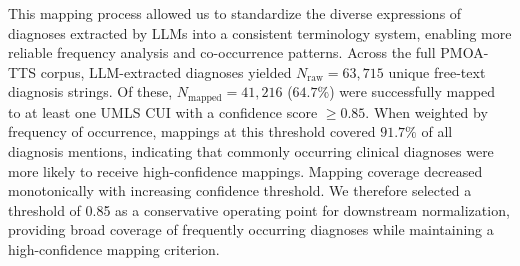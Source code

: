 This mapping process allowed us to standardize the diverse expressions of diagnoses extracted by LLMs into a consistent terminology system, enabling more reliable frequency analysis and co-occurrence patterns. 
Across the full PMOA-TTS corpus, LLM-extracted diagnoses yielded
$N_{\text{raw}} = 63{,}715$ unique free-text diagnosis strings.
Of these, $N_{\text{mapped}} = 41{,}216$ ($64.7\%$) were successfully mapped to at least one
UMLS CUI with a confidence score $\ge 0.85$.
When weighted by frequency of occurrence, mappings at this threshold covered
$91.7\%$ of all diagnosis mentions, indicating that commonly occurring clinical
diagnoses were more likely to receive high-confidence mappings.
Mapping coverage decreased monotonically with increasing confidence threshold.
We therefore selected a threshold of 0.85 as a conservative operating point for
downstream normalization, providing broad coverage of frequently occurring diagnoses
while maintaining a high-confidence mapping criterion.
